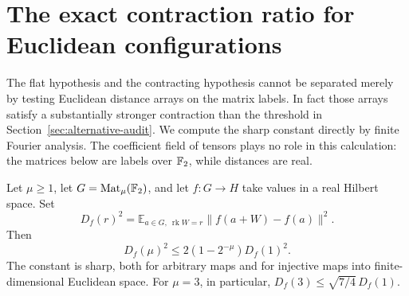 \section{The exact contraction ratio for Euclidean configurations}
\label{sec:euclidean-contraction}

The flat hypothesis and the contracting hypothesis cannot be separated
merely by testing Euclidean distance arrays on the matrix labels.
In fact those arrays satisfy a substantially stronger contraction
than the threshold in Section~\ref{sec:alternative-audit}.
We compute the sharp constant directly by finite Fourier analysis.
The coefficient field of tensors plays no role in this calculation:
the matrices below are labels over $\mathbb F_2$, while distances are real.

\begin{proposition}
\label{prop:euclidean-matrix-contraction}
Let $\mu\geq1$, let $G=\operatorname{Mat}_{\mu}(\mathbb F_2)$,
and let $f:G\to H$ take values in a real Hilbert space.  Set
\[
 D_f(r)^2=
 \mathbb E_{a\in G,\ \operatorname{rk}W=r}
          \|f(a+W)-f(a)\|^2.
\]
Then
\[
 D_f(\mu)^2\leq2(1-2^{-\mu})D_f(1)^2.
\]
The constant is sharp, both for arbitrary maps and for injective
maps into finite-dimensional Euclidean space. For $\mu=3$, in particular,
$D_f(3)\leq\sqrt{7/4}\,D_f(1)$.
\end{proposition}

